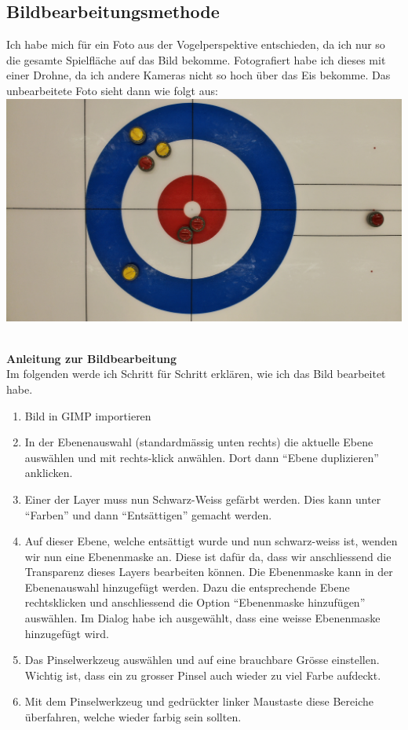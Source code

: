 \documentclass[11pt]{article}
\begin{document}
    \subsection{Bildbearbeitungsmethode}
    Ich habe mich für ein Foto aus der Vogelperspektive entschieden, da ich nur so die gesamte Spielfläche
    auf das Bild bekomme. Fotografiert habe ich dieses mit einer Drohne, da ich andere Kameras nicht so hoch
    über das Eis bekomme. Das unbearbeitete Foto sieht dann wie folgt aus:\\
    \includegraphics[width=\textwidth]{media/unedited}

    \\ \textbf{Anleitung zur Bildbearbeitung}\\
    Im folgenden werde ich Schritt für Schritt erklären, wie ich das Bild bearbeitet habe.

    \begin{enumerate}
        \item Bild in GIMP importieren
        \item In der Ebenenauswahl (standardmässig unten rechts) die aktuelle Ebene auswählen und mit rechts-klick
        anwählen. Dort dann ``Ebene duplizieren'' anklicken.
        \item Einer der Layer muss nun Schwarz-Weiss gefärbt werden. Dies kann unter ``Farben'' und dann
        ``Entsättigen'' gemacht werden. %
        \item Auf dieser Ebene, welche entsättigt wurde und nun schwarz-weiss ist, wenden wir nun eine
        Ebenenmaske an. Diese ist dafür da, dass wir anschliessend die Transparenz dieses Layers bearbeiten können.
        Die Ebenenmaske kann in der Ebenenauswahl hinzugefügt werden. Dazu die entsprechende Ebene rechtsklicken und
        anschliessend die Option ``Ebenenmaske hinzufügen'' auswählen. Im Dialog habe ich ausgewählt, dass eine weisse
        Ebenenmaske hinzugefügt wird.
        \item Das Pinselwerkzeug auswählen und auf eine brauchbare Grösse einstellen. Wichtig ist, dass ein zu grosser
        Pinsel auch wieder zu viel Farbe aufdeckt.
        \item Mit dem Pinselwerkzeug und gedrückter linker Maustaste diese Bereiche überfahren, welche wieder
        farbig sein sollten.
    \end{enumerate}
\end{document}
